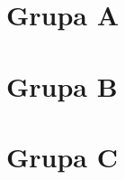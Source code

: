 \usepackage{titlesec}
\usepackage{chngcntr}
\newcommand{\letterchapterformat}{
  \titleformat{\chapter}[display]
    {\normalfont\huge\bfseries}{}{0pt}{}
  \titlespacing*{\chapter}{0pt}{0pt}{0pt}
  
  \renewcommand{\thechapter}{\Alph{chapter}}
  \renewcommand{\thesection}{\thechapter.\arabic{section}}
}

\letterchapterformat

\chapter{Grupa A}


\chapter{Grupa B}


\chapter{Grupa C}

